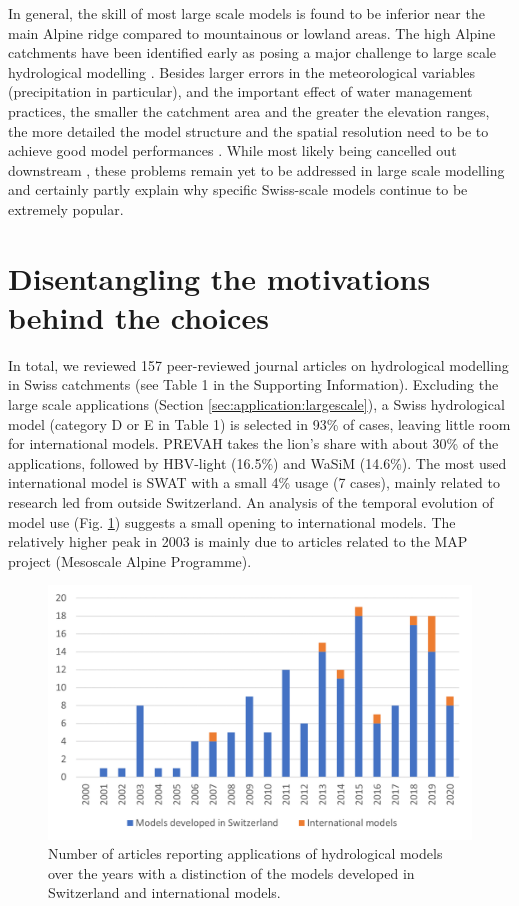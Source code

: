 \documentclass[10pt,a4paper]{article}
\begin{document}
In general, the skill of most large scale models is found to be inferior
near the main Alpine ridge compared to mountainous or lowland areas. The
high Alpine catchments have been identified early as posing a major
challenge to large scale hydrological modelling \citep{Kleinn_2005}. 
Besides larger errors in the meteorological variables (precipitation in
particular), and the important effect of water management practices, the
smaller the catchment area and the greater the elevation ranges, the
more detailed the model structure and the spatial resolution need to be
to achieve good model performances \citep{Gurtz2003}. While most likely
being cancelled out downstream \citep{Kleinn_2005}, these problems
remain yet to be addressed in large scale modelling and certainly partly
explain why specific Swiss-scale models continue to be extremely
popular. 

\section{Disentangling the motivations behind the choices}
\label{sec:motivations}

In total, we reviewed 157 peer-reviewed journal articles on hydrological
modelling in Swiss catchments (see Table 1 in the Supporting
Information). Excluding the large scale applications (Section \ref{sec:application:largescale}), a
Swiss hydrological model (category D or E in Table 1) is selected in
93\% of cases, leaving little room for international models. PREVAH
takes the lion's share with about 30\% of the applications, followed by
HBV-light (16.5\%) and WaSiM (14.6\%). The most used international
model is SWAT with a small 4\% usage (7 cases), mainly related to
research led from outside Switzerland. An analysis of the temporal
evolution of model use (Fig. \ref{fig:bars})
suggests a small opening to international models. The relatively higher
peak in 2003 is mainly due to articles related to the MAP project
(Mesoscale Alpine Programme).

\begin{figure}[htb]
	\begin{center}
		\includegraphics[width=0.70\columnwidth]{figures/histogram.png}
		\caption{{Number of articles reporting applications of hydrological models over
				the years with a distinction of the models developed in Switzerland and
				international models.
				{\label{fig:bars}}
		}}
	\end{center}
\end{figure}
\end{document}

